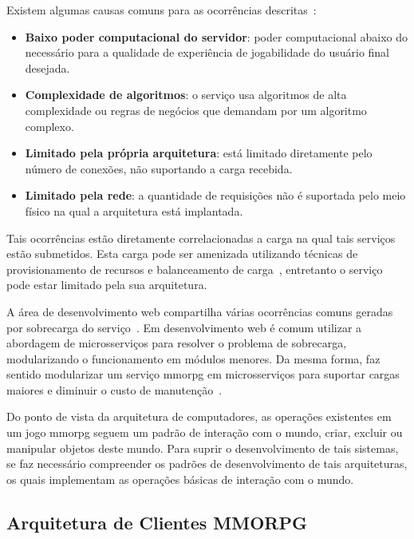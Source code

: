Existem algumas causas comuns para as ocorrências descritas~\cite{1417630}:

\begin{itemize}
  \item \textbf{Baixo poder computacional do servidor}: poder computacional abaixo do necessário para a qualidade de experiência de jogabilidade do usuário final desejada.
  \item \textbf{Complexidade de algoritmos}: o serviço usa algoritmos de alta complexidade ou regras de negócios que demandam por um algoritmo complexo.
  \item \textbf{Limitado pela própria arquitetura}: está limitado diretamente pelo número de conexões, não suportando a carga recebida.
  \item \textbf{Limitado pela rede}: a quantidade de requisições não é suportada pelo meio físico na qual a arquitetura está implantada.
\end{itemize}

Tais ocorrências estão diretamente correlacionadas a carga na qual tais serviços estão submetidos.
%
Esta carga pode ser amenizada utilizando técnicas de provisionamento de recursos e balanceamento de carga~\cite{1417630}, entretanto o serviço pode estar limitado pela sua arquitetura.

A área de desenvolvimento web compartilha várias ocorrências comuns geradas por sobrecarga do serviço~\cite{7830692}.
%
Em desenvolvimento web é comum utilizar a abordagem de microsserviços para resolver o problema de sobrecarga, modularizando o  funcionamento em módulos menores.
%
Da mesma forma, faz sentido modularizar um serviço \ac{mmorpg} em microsserviços para suportar cargas maiores e diminuir o custo de manutenção~\cite{7515686}.



Do ponto de vista da arquitetura de computadores, as operações existentes em um jogo \ac{mmorpg} seguem um padrão de interação com o mundo, criar, excluir ou manipular objetos deste mundo.
%
Para suprir o desenvolvimento de tais sistemas, se faz necessário compreender os padrões de desenvolvimento de tais arquiteturas, os quais implementam as operações básicas de interação com o mundo.



\subsection{Arquitetura de Clientes MMORPG}
\label{sec:cliente}



